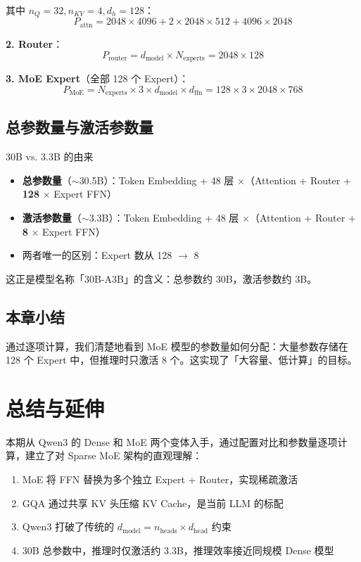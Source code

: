 \documentclass[a4paper]{article}
\begin{document}
其中 $n_Q = 32, n_{KV} = 4, d_h = 128$：
$$
P_{\text{attn}} = 2048 \times 4096 + 2 \times 2048 \times 512 + 4096 \times 2048
$$

\textbf{2. Router}：
$$
P_{\text{router}} = d_{\text{model}} \times N_{\text{experts}} = 2048 \times 128
$$

\textbf{3. MoE Expert}（全部 128 个 Expert）：
$$
P_{\text{MoE}} = N_{\text{experts}} \times 3 \times d_{\text{model}} \times d_{\text{ffn}} = 128 \times 3 \times 2048 \times 768
$$

\subsection{总参数量与激活参数量}

\begin{importantbox}{30B vs. 3.3B 的由来}
\begin{itemize}
  \item \textbf{总参数量}（$\sim$30.5B）：Token Embedding + 48 层 $\times$（Attention + Router + \textbf{128} $\times$ Expert FFN）
  \item \textbf{激活参数量}（$\sim$3.3B）：Token Embedding + 48 层 $\times$（Attention + Router + \textbf{8} $\times$ Expert FFN）
  \item 两者唯一的区别：Expert 数从 128 $\to$ 8
\end{itemize}
\end{importantbox}

这正是模型名称「30B-A3B」的含义：总参数约 30B，激活参数约 3B。

\subsection{本章小结}

通过逐项计算，我们清楚地看到 MoE 模型的参数量如何分配：大量参数存储在 128 个 Expert 中，但推理时只激活 8 个。这实现了「大容量、低计算」的目标。

\section{总结与延伸}

本期从 Qwen3 的 Dense 和 MoE 两个变体入手，通过配置对比和参数量逐项计算，建立了对 Sparse MoE 架构的直观理解：

\begin{enumerate}
  \item MoE 将 FFN 替换为多个独立 Expert + Router，实现稀疏激活
  \item GQA 通过共享 KV 头压缩 KV Cache，是当前 LLM 的标配
  \item Qwen3 打破了传统的 $d_{\text{model}} = n_{\text{heads}} \times d_{\text{head}}$ 约束
  \item 30B 总参数中，推理时仅激活约 3.3B，推理效率接近同规模 Dense 模型
\end{enumerate}
\end{document}
